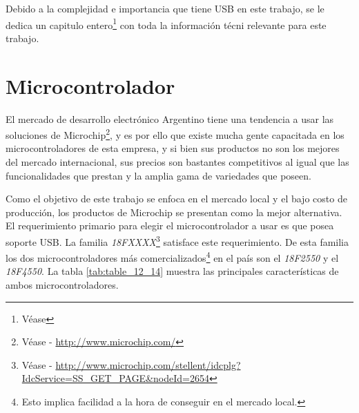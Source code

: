 Debido a la complejidad e importancia que tiene USB en este trabajo, se le
dedica un capitulo entero\footnote{V\'ease } con toda la
informaci\'on t\'ecni relevante para este trabajo.


\section{Microcontrolador} %
El mercado de desarrollo electr\'onico Argentino tiene una tendencia a usar las
soluciones de Microchip\footnote{V\'ease - \url{http://www.microchip.com/}}, y
es por ello que existe mucha gente capacitada en los microcontroladores de esta
empresa, y si bien sus productos no son los mejores del mercado internacional,
sus precios son bastantes competitivos al igual que las funcionalidades que
prestan y la amplia gama de variedades que poseen.\

Como el objetivo de este trabajo se enfoca en el mercado local y el bajo costo
de producci\'on, los productos de Microchip se presentan como la mejor
alternativa.\\

El requerimiento primario para elegir el microcontrolador a usar es que posea
soporte USB. La familia \emph{18FXXXX}\footnote{V\'ease - \url{
http://www.microchip.com/stellent/idcplg?IdcService=SS_GET_PAGE&nodeId=2654}}
satisface este requerimiento. De esta familia los dos microcontroladores m\'as
comercializados\footnote{Esto implica facilidad a la hora de conseguir en el
mercado local.} en el pa\'is son el \emph{18F2550} y el \emph{18F4550}. La
tabla \ref{tab:table_12_14} muestra las principales caracter\'isticas de ambos
microcontroladores.

